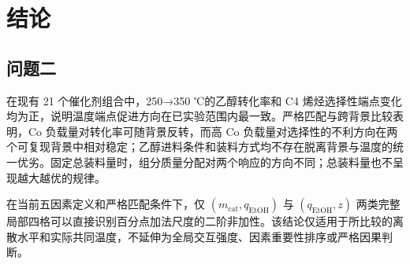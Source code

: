 \section{结论}

\subsection{问题二}

在现有 21 个催化剂组合中，250→350 ℃的乙醇转化率和 C4 烯烃选择性端点变化均为正，说明温度端点促进方向在已实验范围内最一致。严格匹配与跨背景比较表明，Co 负载量对转化率可随背景反转，而高 Co 负载量对选择性的不利方向在两个可复现背景中相对稳定；乙醇进料条件和装料方式均不存在脱离背景与温度的统一优劣。固定总装料量时，组分质量分配对两个响应的方向不同；总装料量也不呈现越大越优的规律。

在当前五因素定义和严格匹配条件下，仅 $(m_{\mathrm{cat}},q_{\mathrm{EtOH}})$ 与 $(q_{\mathrm{EtOH}},z)$ 两类完整局部四格可以直接识别百分点加法尺度的二阶非加性。该结论仅适用于所比较的离散水平和实际共同温度，不延伸为全局交互强度、因素重要性排序或严格因果判断。
